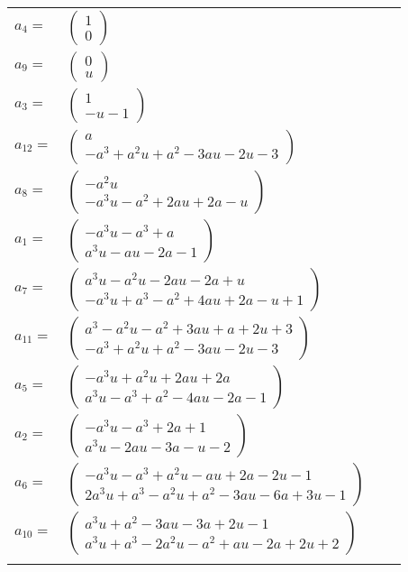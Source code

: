 \documentclass[1p]{elsarticle_modified}
\theoremstyle{definition}
\begin{document}
\begin{tabular}{m{7pt} m{180pt} m{7pt} m{180pt} }
\flushright $a_{4}=$&$\begin{pmatrix}1\\0\end{pmatrix}$ \\
\flushright $a_{9}=$&$\begin{pmatrix}0\\u\end{pmatrix}$ \\
\flushright $a_{3}=$&$\begin{pmatrix}1\\- u-1\end{pmatrix}$ \\
\flushright $a_{12}=$&$\begin{pmatrix}a\\- a^3+a^2 u+a^2-3 a u-2 u-3\end{pmatrix}$ \\
\flushright $a_{8}=$&$\begin{pmatrix}- a^2 u\\- a^3 u- a^2+2 a u+2 a- u\end{pmatrix}$ \\
\flushright $a_{1}=$&$\begin{pmatrix}- a^3 u- a^3+a\\a^3 u- a u-2 a-1\end{pmatrix}$ \\
\flushright $a_{7}=$&$\begin{pmatrix}a^3 u- a^2 u-2 a u-2 a+u\\- a^3 u+a^3- a^2+4 a u+2 a- u+1\end{pmatrix}$ \\
\flushright $a_{11}=$&$\begin{pmatrix}a^3- a^2 u- a^2+3 a u+a+2 u+3\\- a^3+a^2 u+a^2-3 a u-2 u-3\end{pmatrix}$ \\
\flushright $a_{5}=$&$\begin{pmatrix}- a^3 u+a^2 u+2 a u+2 a\\a^3 u- a^3+a^2-4 a u-2 a-1\end{pmatrix}$ \\
\flushright $a_{2}=$&$\begin{pmatrix}- a^3 u- a^3+2 a+1\\a^3 u-2 a u-3 a- u-2\end{pmatrix}$ \\
\flushright $a_{6}=$&$\begin{pmatrix}- a^3 u- a^3+a^2 u- a u+2 a-2 u-1\\2 a^3 u+a^3- a^2 u+a^2-3 a u-6 a+3 u-1\end{pmatrix}$ \\
\flushright $a_{10}=$&$\begin{pmatrix}a^3 u+a^2-3 a u-3 a+2 u-1\\a^3 u+a^3-2 a^2 u- a^2+a u-2 a+2 u+2\end{pmatrix}$\\&\end{tabular}
\end{document}
